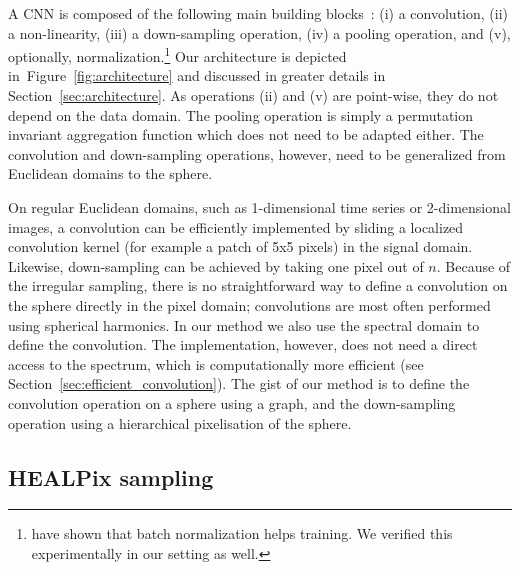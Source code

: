 \documentclass[final,twocolumn,3p,times,authoryear]{elsarticle}
\newcommand{\TK}[1]{{\color{red}{TK:#1}}}
\newcommand{\figref}[1]{Figure~\ref{fig:#1}}
\newcommand{\secref}[1]{Section~\ref{sec:#1}}
\newcommand{\1}{\b{1}}              %
\newcommand{\0}{\b{0}}              %
\begin{document}
A CNN is composed of the following main building blocks~\citep{lecun1998cnn}:
(i) a convolution,
(ii) a non-linearity,
(iii) a down-sampling operation,
(iv) a pooling operation, and
(v), optionally,  normalization.\footnote{\citet{ioffe2015batchnorm} have shown that batch normalization helps training. We verified this experimentally in our setting as well.}
Our architecture is depicted in~\figref{architecture} and discussed in greater details in \secref{architecture}. As operations (ii) and (v) are point-wise, they do not depend on the data domain. The pooling operation is simply a permutation invariant aggregation function which does not need to be adapted either. The convolution and down-sampling operations, however, need to be generalized from Euclidean domains to the sphere.

On regular Euclidean domains, such as 1-dimensional time series or 2-dimensional images, a convolution can be efficiently implemented by sliding a localized convolution kernel (for example a patch of 5x5 pixels) in the signal domain.
Likewise, down-sampling can be achieved by taking one pixel out of $n$.
Because of the irregular sampling, there is no straightforward way to define a convolution on the sphere directly in the pixel domain; convolutions are most often performed using spherical harmonics.
In our method we also use the spectral domain to define the convolution.
The implementation, however, does not need a direct access to the spectrum, which is computationally more efficient (see \secref{efficient_convolution}).
The gist of our method is to define the convolution operation on a sphere using a graph, and the down-sampling operation using a hierarchical pixelisation of the sphere.


\subsection{HEALPix sampling}
\label{sec:healpix}
\end{document}
